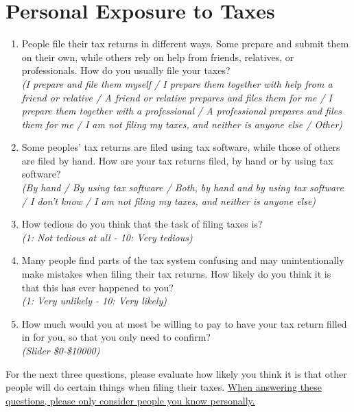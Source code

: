\documentclass[11pt]{article}
\begin{document}
\section*{Personal Exposure to Taxes}
\begin{enumerate}[resume]
    \item People file their tax returns in different ways. Some prepare and submit them on their own, while others rely on help from friends, relatives, or professionals. How do you usually file your taxes?\\ 
    \textit{(I prepare and file them myself / I prepare them together with help from a friend or relative /  A friend or relative prepares and files them for me / I prepare them together with a professional / A professional prepares and files them for me / I am not filing my taxes, and neither is anyone else / Other)}
    \item Some peoples' tax returns are filed using tax software, while those of others are filed by hand. How are your tax returns filed, by hand or by using tax software? \\ 
    \textit{(By hand / By using tax software / Both, by hand and by using tax software / I don't know / I am not filing my taxes, and neither is anyone else)}
    \item How tedious do you think that the task of filing taxes is? \\ \textit{(1: Not tedious at all - 10: Very tedious)}
    \item Many people find parts of the tax system confusing and may unintentionally make mistakes when filing their tax returns. How likely do you think it is that this has ever happened to you?\\
    \textit{(1: Very unlikely - 10: Very likely) }
    \item How much would you at most be willing to pay to have your tax return filled in for you, so that you only need to confirm? \\
    \textit{(Slider \$0-\$10000)}
\end{enumerate}
For the next three questions, please evaluate how likely you think it is that other people will do certain things when filing their taxes. \uline{When answering these questions, please only consider people you know personally.}
\end{document}
